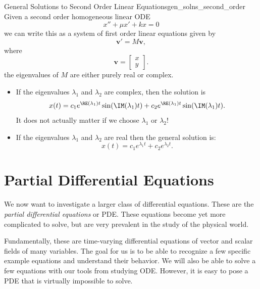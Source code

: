         \begin{prop}{General Solutions to Second Order Linear Equations}{gen_solns_second_order}
        Given a second order homogeneous linear ODE
        \[
        x'' + \mu x' + kx = 0
        \]
        we can write this as a system of first order linear equations given by
        \[
        \mathbf{v}' = M \mathbf{v},
        \]
        where
        \[
        \mathbf{v} = \begin{bmatrix} x \\ y \end{bmatrix}.
        \]
        the eigenvalues of $M$ are either purely real or complex.
        
        \begin{itemize}
            \item If the eigenvalues $\lambda_1$ and $\lambda_2$ are complex, then the solution is
        \[
        x(t)= c_1 e^{\RE(\lambda_1)t} \sin(\IM(\lambda_1)t) + c_2 e^{\RE(\lambda_1)t} \sin(\IM(\lambda_1)t).
        \]
        It does not actually matter if we choose $\lambda_1$ or $\lambda_2$!
        \item         If the eigenvalues $\lambda_1$ and $\lambda_2$ are real then the general solution is:
        \[
        x(t) = c_1 e^{\lambda_1 t} + c_2 e^{\lambda_2 t}.
        \]
        \end{itemize}
        \end{prop}
        
        
        
        \chapter{Partial Differential Equations}
        
        We now want to investigate a larger class of differential equations.  These are the \emph{partial differential equations} or PDE.  These equations become yet more complicated to solve, but are very prevalent in the study of the physical world.
        
        Fundamentally, these are time-varying differential equations of vector and scalar fields of many variables.  The goal for us is to be able to recognize a few specific example equations and understand their behavior.  We will also be able to solve a few equations with our tools from studying ODE. However, it is easy to pose a PDE that is virtually impossible to solve.  
        
